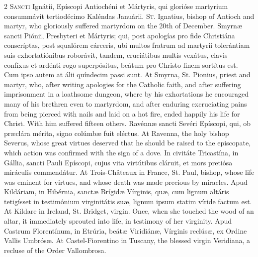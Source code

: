 \begin{paracol}{2}
\lettrine[lines=2]{S}{ancti} Ignátii, Epíscopi Antiochéni et Mártyris, qui glorióse martyrium 
 consummávit tertiodécimo Kaléndas Januárii.
\switchcolumn
{}
\lettrine[lines=2]{S}{t.} Ignatius, bishop of Antioch and martyr, who gloriously suffered 
 martyrdom on the 20th of December.
\switchcolumn*
{}
Smyrnæ sancti Piónii, Presbyteri et Mártyris; 
 qui, post apologías pro fide Christiána conscríptas, post squalórem cárceris, 
 ubi multos fratrum ad martyrii tolerántiam suis exhortatiónibus roborávit, 
 tandem, cruciátibus multis vexátus, clavis confíxus et ardénti rogo 
 superpósitus, beátum pro Christo finem sortítus est. Cum ipso autem at 
 álii quíndecim passi sunt.
\switchcolumn
{}
At Smyrna, St. Pionius, priest and martyr, who, after writing apologies for 
 the Catholic faith, and after suffering imprisonment in a loathsome dungeon, 
 where by his exhortations he encouraged many of his brethren even to 
 martyrdom, and after enduring excruciating pains from being pierced with 
 nails and laid on a hot fire, ended happily his life for Christ. With 
 him suffered fifteen others.
\switchcolumn*
{}
Ravénnæ sancti Sevéri Epíscopi, qui, ob 
 præclára mérita, signo colúmbæ fuit eléctus.
\switchcolumn
{}
At Ravenna, the holy bishop Severus, whose great virtues deserved that he 
 should be raised to the episcopate, which action was confirmed with the sign 
 of a dove.
\switchcolumn*
{}
In civitáte Tricastína, in Gállia, sancti Pauli Epíscopi, cujus vita 
 virtútibus cláruit, et mors pretiósa miráculis commendátur.
\switchcolumn
{}
At Trois-Châteaux in France, St. Paul, bishop, whose life was eminent for 
 virtues, and whose death was made precious by miracles.
\switchcolumn*
{}
Apud Kildáriam, in Hibérnia, sanctæ Brígidæ 
 Vírginis, quæ, cum lignum altáris tetigísset in testimónium virginitátis suæ, 
 lignum ipsum statim víride factum est.
\switchcolumn
{}
At Kildare in Ireland, St. Bridget, virgin. Once, when she touched the 
 wood of an altar, it immediately sprouted into life, in testimony of her 
 virginity.
\switchcolumn*
{}
Apud Castrum Florentínum, in Etrúria, beátæ 
 Viridiánæ, Vírginis reclúsæ, ex Ordine Vallis Umbrósæ.
\switchcolumn
{}
At Castel-Fiorentino in Tuscany, the blessed virgin Veridiana, a recluse of 
 the Order Vallombrosa.
\switchcolumn*
{}
\end{paracol}

